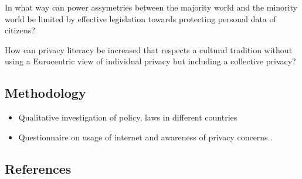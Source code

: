 \documentclass[
  letterpaper,
  DIV=11,
  numbers=noendperiod]{scrartcl}
\providecommand{\tightlist}{%
  \setlength{\itemsep}{0pt}\setlength{\parskip}{0pt}}
\begin{document}
In what way can power assymetries between the majority world and the
minority world be limited by effective legislation towards protecting
personal data of citizens?

How can privacy literacy be increased that respects a cultural tradition
without using a Eurocentric view of individual privacy but including a
collective privacy?

\subsection{Methodology}\label{methodology}

\begin{itemize}
\tightlist
\item
  Qualitative investigation of policy, laws in different countries
\item
  Questionnaire on usage of internet and awareness of privacy concerns..
\end{itemize}

\subsection*{References}\label{references}
\end{document}

